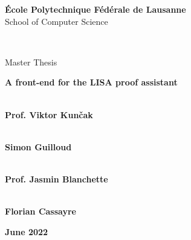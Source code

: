 \begin{center}
{\LARGE \textbf{École Polytechnique Fédérale de Lausanne}} \\
\vspace{0.2cm}
{\Large {School of Computer Science}} \\
\vspace{1cm}

 \\
\vspace{0.8cm}

{\Large {Master Thesis}} \\
\vspace{1cm}

{\LARGE \textbf{A front-end for the LISA proof assistant}} \\
\vspace{1cm}

\end{center}

\begin{multicols}{2}
\hfuzz=10pt %

 \\
\large{\textbf{Prof. Viktor Kunčak}} \\
\vspace{0.1cm}

 \\
\large{\textbf{Simon Guilloud}} \\
\vspace{0.1cm}

 \\
\large{\textbf{Prof. Jasmin Blanchette}} \\
\vspace{0.1cm}
\columnbreak

 \\
\large{\textbf{Florian Cassayre}} \\
\end{multicols}

\vspace{2cm}

\begin{center}
  \large{\textbf{June 2022}}
\end{center}
